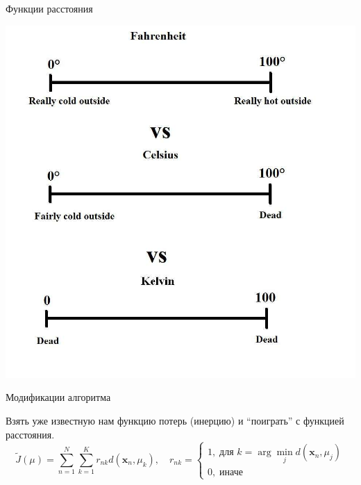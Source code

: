\documentclass[aspectratio=169]{beamer}
\begin{document}
\begin{frame}

\begin{center}
{\Large Функции расстояния}

\vspace{1em}
\includegraphics[height=0.8\textheight]{images/celsius.jpg}
\end{center}

\end{frame}

\begin{frame}{Модификации алгоритма}

Взять уже известную нам функцию потерь (инерцию) и ``поиграть'' с функцией расстояния. 
\[
\tilde J(\mu) = \sum_{n=1}^N \sum_{k=1}^K r_{nk} d(\mathbf{x}_n, \mu_k), \quad r_{nk} = \begin{cases}
1, \; \text{для } k = \arg \min_j d(\mathbf{x}_n, \mu_j) \\
0, \; \text{иначе}
\end{cases}
\]
\end{frame}
\end{document}
